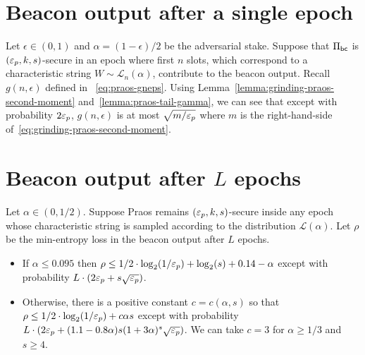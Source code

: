 \section{Beacon output after a single epoch}
Let $\epsilon \in (0,1)$ and $\alpha = (1-\epsilon)/2$ be the adversarial stake.
Suppose that $\Pi_\mathsf{bc}$ is $(\mathsf{\varepsilon}_p, k, s)$-secure in an epoch 
where first $n$ slots, 
which correspond to a characteristic string $W \sim \mathcal{L}_n(\alpha)$, 
contribute to the beacon output.
Recall $g(n,\epsilon)$ defined in ~\eqref{eq:praos-gneps}.
Using Lemma~\ref{lemma:grinding-praos-second-moment} and~\ref{lemma:praos-tail-gamma}, 
we can see that except with probability $2\mathsf{\varepsilon}_p$, $g(n,\epsilon)$ is at most $\sqrt{m/\mathsf{\varepsilon}_p}$ 
where $m$ is the right-hand-side of~\eqref{eq:grinding-praos-second-moment}.


\section{Beacon output after $L$ epochs}\label{sec:thm-praos-multiepoch}\label{sec:proof-praos-theorem}



\begin{theorem}\label{thm:minentropy-loss-praos}  
  Let $\alpha \in (0, 1/2)$. 
  Suppose Praos 
  remains $(\mathsf{\varepsilon}_p, k, s)$-secure 
  inside any epoch 
  whose characteristic string is sampled 
  according to the distribution $\mathcal{L}(\alpha)$.
  Let $\rho$ be the min-entropy loss in 
  the beacon output after $L$ epochs. 
  \begin{itemize}
    \item If $\alpha \leq 0.095$ then 
    $\rho \leq 1/2 \cdot \log_2(1/\mathsf{\varepsilon}_p) + \log_2(s) + 0.14 - \alpha$ 
    except with probability $L \cdot (2 \mathsf{\varepsilon}_p + s \sqrt{\mathsf{\varepsilon}_p} )$.

    \item Otherwise, there is a positive constant $c = c(\alpha, s)$ so that 
    $\rho \leq 1/2 \cdot \log_2(1/\mathsf{\varepsilon}_p) 
    + c \alpha s
    $ 
    except with probability $L \cdot (2 \mathsf{\varepsilon}_p + (1.1 - 0.8 \alpha) s (1+3\alpha)^s \sqrt{\mathsf{\varepsilon}_p} )$. 
    We can take $c = 3$ for $\alpha \geq 1/3$ and $s \geq 4$.
  \end{itemize}
\end{theorem}

